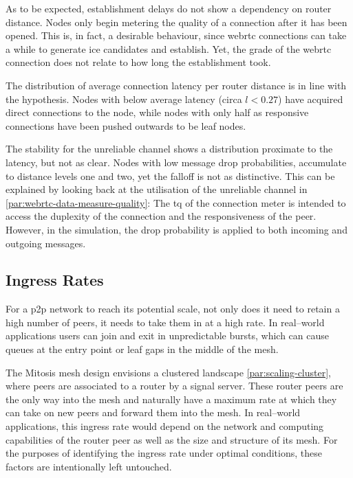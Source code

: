 As to be expected, establishment delays do not show a dependency on router distance. Nodes only begin metering the quality of a connection after it has been opened. This is, in fact, a desirable behaviour, since \gls{webrtc} connections can take a while to generate \gls{ice} candidates and establish. Yet, the grade of the \gls{webrtc} connection does not relate to how long the establishment took.

The distribution of average connection latency per router distance is in line with the hypothesis. Nodes with below average latency (circa $l<0.27$) have acquired direct connections to the \router node, while nodes with only half as responsive connections have been pushed outwards to be leaf nodes.

The stability for the unreliable channel shows a distribution proximate to the latency, but not as clear. Nodes with low message drop probabilities, accumulate to distance levels one and two, yet the falloff is not as distinctive. This can be explained by looking back at the utilisation of the unreliable channel in \vref{par:webrtc-data-measure-quality}: The \gls{tq} of the connection meter is intended to access the duplexity of the connection and the responsiveness of the peer. However, in the simulation, the drop probability is applied to both incoming and outgoing messages.

\subsection{Ingress Rates}

For a \gls{p2p} network to reach its potential scale, not only does it need to retain a high number of peers, it needs to take them in at a high rate. In real–world applications users can join and exit in unpredictable bursts, which can cause queues at the entry point or leaf gaps in the middle of the mesh.

The Mitosis mesh design envisions a clustered landscape \cref{par:scaling-cluster}, where peers are associated to a router by a signal server. These router peers are the only way into the mesh and naturally have a maximum rate at which they can take on new peers and forward them into the mesh. In real–world applications, this ingress rate would depend on the network and computing capabilities of the router peer as well as the size and structure of its mesh. For the purposes of identifying the ingress rate under optimal conditions, these factors are intentionally left untouched.

